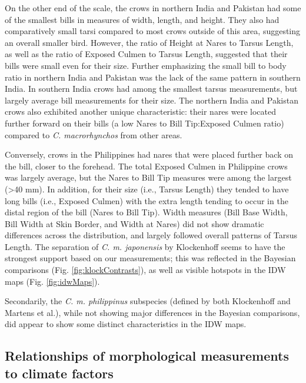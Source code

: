 \documentclass[10pt,a4paper]{article}
\begin{document}
On the other end of the scale, the crows in northern India and Pakistan had some of the smallest bills in measures of width, length, and height.
They also had comparatively small tarsi compared to most crows outside of this area, suggesting an overall smaller bird.
However, the ratio of Height at Nares to Tarsus Length, as well as the ratio of Exposed Culmen to Tarsus Length, suggested that their bills were small even for their size.
Further emphasizing the small bill to body ratio in northern India and Pakistan was the lack of the same pattern in southern India.
In southern India crows had among the smallest tarsus measurements, but largely average bill measurements for their size.
The northern India and Pakistan crows also exhibited another unique characteristic: their nares were located further forward on their bills (a low Nares to Bill Tip:Exposed Culmen ratio) compared to \emph{C. macrorhynchos} from other areas.

Conversely, crows in the Philippines had nares that were placed further back on the bill, closer to the forehead.
The total Exposed Culmen in Philippine crows was largely average, but the Nares to Bill Tip measures were among the largest (\textgreater40 mm).
In addition, for their size (i.e., Tarsus Length) they tended to have long bills (i.e., Exposed Culmen) with the extra length tending to occur in the distal region of the bill (Nares to Bill Tip).
Width measures (Bill Base Width, Bill Width at Skin Border, and Width at Nares) did not show dramatic differences across the distribution, and largely followed overall patterns of Tarsus Length.
The separation of \emph{C. m. japonensis} by Klockenhoff seems to have the strongest support based on our measurements; this was reflected in the Bayesian comparisons (Fig. \ref{fig:klockContrasts}), as well as visible hotspots in the IDW maps (Fig. \ref{fig:idwMaps}).

Secondarily, the \emph{C. m. philippinus} subspecies (defined by both Klockenhoff and Martens et al.), while not showing major differences in the Bayesian comparisons, did appear to show some distinct characteristics in the IDW maps.

\subsection{Relationships of morphological measurements to climate factors}\label{relationships-of-morphological-measurements-to-climate-factors}
\end{document}
